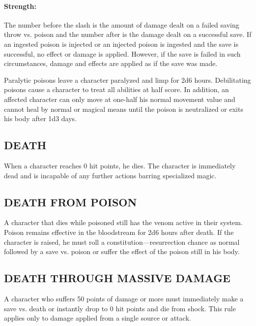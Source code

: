 \begin{multicols}{2}
\paragraph{Strength:} The number before the slash is the amount of damage dealt on a failed saving throw vs. poison and the number after is the damage dealt on a successful save.  If an ingested poison is injected or an injected poison is ingested and the save is successful, no effect or damage is applied. However, if the save is failed in such circumstances, damage and effects are applied as if the save was made.  

Paralytic poisons leave a character paralyzed and limp for 2d6 hours.  Debilitating poisons cause a character to treat all abilities at half score. In addition, an affected character can only move at one-half his normal movement value and cannot heal by normal or magical means until the poison is neutralized or exits his body after 1d3 days.

\subsection{DEATH}

When a character reaches 0 hit points, he dies.  The character is immediately dead and is incapable of any further actions barring specialized magic.

\subsection{DEATH FROM POISON}

A character that dies while poisoned still has the venom active in their system.  Poison remains effective in the bloodstream for 2d6 hours after death.  If the character is raised, he must roll a constitution---resurrection chance as normal followed by a save vs. poison or suffer the effect of the poison still in his body.

\subsection{DEATH THROUGH MASSIVE DAMAGE}

A character who suffers 50 points of damage or more must immediately make a save vs. death or instantly drop to 0 hit points and die from shock.  This rule applies only to damage applied from a single source or attack.  


\end{multicols}
